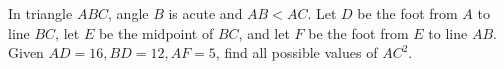 In triangle $ABC$, angle $B$ is acute and $AB<AC$. Let $D$ be the foot from $A$ to line $BC$, let $E$ be the midpoint of $BC$, and let $F$ be the foot from $E$ to line $AB$. Given $AD=16,BD=12,AF=5$, find all possible values of $AC^2$.
